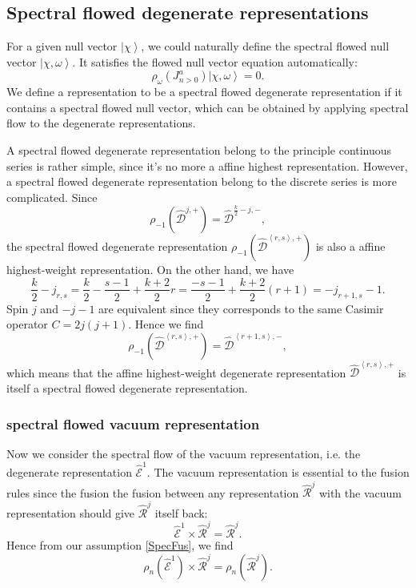 \documentclass[10pt,a4paper]{article}
\numberwithin{equation}{section}
\newcommand{\ket}[1]{\left| #1 \right\rangle}
\newcommand{\vev}[1]{\left\langle #1 \right\rangle}
\begin{document}
\subsection{Spectral flowed degenerate representations}

For a given null vector $\ket{\chi}$, we could naturally define the spectral flowed null vector $\ket{\chi,\omega}$. 
It satisfies the flowed null vector equation automatically:
\begin{equation}
    \rho_{\omega} \left(J^{a}_{n>0}\right) \ket{\chi,\omega} = 0.
\end{equation}
We define a representation to be a spectral flowed degenerate representation if it contains a spectral flowed null vector, which can 
be obtained by applying spectral flow to the degenerate representations.

A spectral flowed degenerate representation belong to the principle continuous series is rather simple, since it's no more a affine 
highest representation. However, a spectral flowed degenerate representation belong to the discrete series is more complicated. 
Since 
\begin{equation}
    \rho_{-1} \left( \widehat{\mathcal{D}}^{j,+} \right) = \widehat{\mathcal{D}}^{\frac{k}{2}-j,-},
\end{equation}
the spectral flowed degenerate representation $\rho_{-1} \left( \widehat{\mathcal{D}}^{\vev{r,s},+} \right)$ is also a affine highest-weight 
representation. On the other hand, we have 
\begin{equation}
    \frac{k}{2} - j_{r,s} = \frac{k}{2} - \frac{s-1}{2} + \frac{k+2}{2} r = \frac{-s-1}{2} + \frac{k+2}{2}(r+1) = -j_{r+1,s}-1.
\end{equation}
Spin $j$ and $-j-1$ are equivalent since they corresponds to the same Casimir operator $C = 2j(j+1)$. Hence we find 
\begin{equation}
    \rho_{-1} \left( \widehat{\mathcal{D}}^{\vev{r,s},+} \right) = \widehat{\mathcal{D}}^{\vev{r+1,s},-},
\end{equation}
which means that the affine highest-weight degenerate representation $\widehat{\mathcal{D}}^{\vev{r,s},+}$ is itself a spectral flowed 
degenerate representation. 

\subsubsection*{spectral flowed vacuum representation} 
Now we consider the spectral flow of the vacuum representation, i.e. the degenerate representation $\hat{\mathcal{E}}^{1}$. The vacuum 
representation is essential to the fusion rules since the fusion the fusion between any representation $\hat{\mathcal{R}}^{j}$ with 
the vacuum representation should give $\hat{\mathcal{R}}^{j}$ itself back: 
\begin{equation}
    \hat{\mathcal{E}}^{1} \times \hat{\mathcal{R}}^{j} = \hat{\mathcal{R}}^{j}.
\end{equation}
Hence from our assumption \ref{SpecFus}, we find 
\begin{equation}
    \rho_{n} \left( \hat{\mathcal{E}}^{1} \right) \times \hat{\mathcal{R}}^{j} = \rho_{n} \left( \hat{\mathcal{R}}^{j} \right).
\end{equation}
\end{document}
